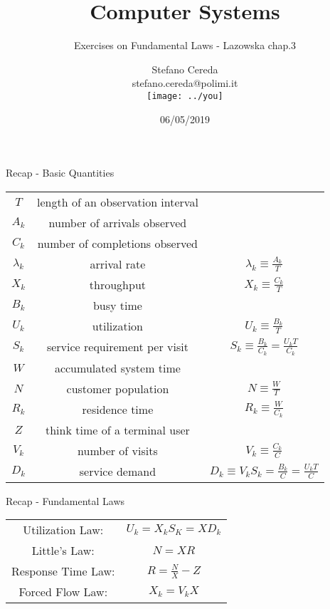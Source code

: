 \documentclass[]{beamer}
\title{Computer Systems}
\subtitle{Exercises on Fundamental Laws - Lazowska chap.3}
\author{Stefano Cereda \\ stefano.cereda@polimi.it \\
\texttt{[image: ../you]}}
\date{06/05/2019}
\institute[PoliMi]{\centering Politecnico di Milano \\ \vspace{0.2cm}
	\texttt{[image: ../logopolimi]}}
\begin{document}
\begin{frame}
	\maketitle
\end{frame}

%

\begin{frame}{Recap - Basic Quantities}
\centering
\begin{tabular}{ccc}
    \emph{$T$}	&	length of an observation interval  &   \\
    \emph{$A_k$}	&	number of arrivals observed    &   \\
    \emph{$C_k$}	&	number of completions observed &   \\
    \emph{$\lambda_k$}	&	arrival rate &   $\lambda_k \equiv 	\frac{A_k}{T}$  \\
    \emph{$X_k$}	&	throughput    &   $X_k \equiv \frac{C_k}{T}$  \\
    \emph{$B_k$}	&	busy time  &   \\
    \emph{$U_k$}	&	utilization    &   $U_k \equiv \frac{B_k}{T}$  \\
    \emph{$S_k$}	&	service requirement per visit	&	$S_k \equiv \frac{B_k}{C_k} = \frac{U_k T}{C_k}$    \\
    \emph{$W$}      &   accumulated system time   &   \\
    \emph{$N$}      &	customer population  &   $N \equiv \frac{W}{T}$    \\
    \emph{$R_k$}	&	residence time   &   $R_k \equiv \frac{W}{C_k}$    \\
    \emph{$Z$}      &	think time of a terminal user &  \\
    \emph{$V_k$}	&	number of visits &   $V_k \equiv \frac{C_k}{C}$   \\
    \emph{$D_k$}	&	service demand   &   $D_k \equiv V_k S_k = \frac{B_k}{C} = \frac{U_k T}{C}$    \\
\end{tabular}
\end{frame}

\begin{frame}{Recap - Fundamental Laws}
\centering
\begin{tabular}{cc}
	Utilization Law:	&	$U_k = X_k S_K = X D_k$ \\
	Little's Law:		&	$N = X R$	\\
	Response Time Law:	&	$R = \frac{N}{X} - Z$	\\
	Forced Flow Law:	&	$X_k = V_k X$	\\
\end{tabular}
\end{frame}
\end{document}
